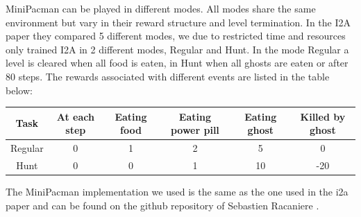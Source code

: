 MiniPacman can be played in different modes. All modes share the same environment but vary in their reward structure and level termination.
In the I2A paper they compared 5 different modes, we due to restricted time and resources only trained I2A in 2 different modes, Regular and Hunt. In the mode Regular a level is cleared when all food is eaten, in Hunt when all ghosts are eaten or after 80 steps. 
The rewards associated with different events are listed in the table below:

\begin{center}
	\begin{tabular}{| c | c | c | c |c | c | }
	\hline
	Task 	& At each step 	& Eating food 
		& Eating power pill & Eating ghost  & Killed by ghost\\
	\hline
	Regular & 0		& 1 	& 2		& 5		& 0 \\
	Hunt	& 0		& 0		& 1		& 10	& -20\\
	\hline
	\end{tabular}
\end{center}

The MiniPacman implementation we used is the same as the one used in the i2a paper and can be found on the github repository of Sebastien Racaniere \cite{MiniPacmanRepo}.


